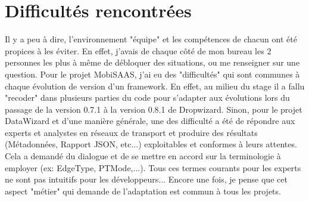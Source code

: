 \section{Difficultés rencontrées}

Il y a peu à dire, l'environnement "équipe" et les compétences de chacun ont été propices à les éviter. En effet, j'avais de chaque côté de mon bureau les 2 personnes les plus à même de débloquer des situations, ou me renseigner sur une question. Pour le projet MobiSAAS, j'ai eu des "difficultés" qui sont communes à chaque évolution de version d'un framework. En effet, au milieu du stage il a fallu "recoder" dans plusieurs parties du code pour s'adapter aux évolutions lors du passage de la version 0.7.1 à la version 0.8.1 de Dropwizard.
Sinon, pour le projet DataWizard et d'une manière générale, une des difficulté a été de répondre aux experts et analystes en réseaux de transport et produire des résultats (Métadonnées, Rapport JSON, etc...) exploitables et conformes à leurs attentes. Cela a demandé du dialogue et de se mettre en accord sur la terminologie à employer (ex: EdgeType, PTMode,...). Tous ces termes courants pour les experts ne sont pas intuitifs pour les développeurs... Encore une fois, je pense que cet aspect "métier" qui demande de l'adaptation est commun à tous les projets.\\
